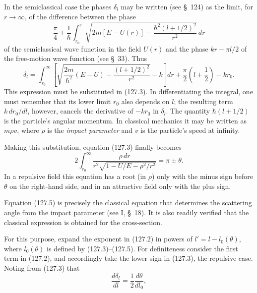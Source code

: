 In the semiclassical case the phases $\delta_l$ may be written (see \S~124)
as the limit, for $r\to\infty$, of the difference between the phase
\[
 \frac\pi4+\frac1\hbar\int_{r_0}^{r}
 \sqrt{2m[E-U(r)]-\frac{\hbar^2(l+1/2)^2}{r^2}}\,dr
\]
of the semiclassical wave function in the field $U(r)$ and the phase
$kr-\pi l/2$ of the free-motion wave function (see \S~33). Thus
\begin{equation}
 \delta_l=\int_{r_0}^{\infty}\left[\sqrt{\frac{2m}{\hbar^2}(E-U)-\frac{(l+1/2)^2}{r^2}}-k\right]dr
 +\frac\pi2\left(l+\frac12\right)-kr_0.
 \tag{127.4}
\end{equation}
This expression must be substituted in (127.3). In differentiating the
integral, one must remember that its lower limit $r_0$ also depends on $l$;
the resulting term $k\,dr_0/dl$, however, cancels the derivative of
$-kr_0$ in $\delta_l$. The quantity $\hbar(l+1/2)$ is the particle's angular
momentum. In classical mechanics it may be written as $m\rho v$, where
$\rho$ is the \emph{impact parameter} and $v$ is the particle's speed at
infinity.

Making this substitution, equation (127.3) finally becomes
\begin{equation}
 2\int_{r_0}^{\infty}\frac{\rho\,dr}{r^2\sqrt{1-U/E-\rho^2/r^2}}=\pi\pm\theta.
 \tag{127.5}
\end{equation}
In a repulsive field this equation has a root (in $\rho$) only with the minus
sign before $\theta$ on the right-hand side, and in an attractive field only
with the plus sign.

Equation (127.5) is precisely the classical equation that determines the
scattering angle from the impact parameter (see I, \S~18). It is also readily
verified that the classical expression is obtained for the cross-section.

For this purpose, expand the exponent in (127.2) in powers of
$l'=l-l_0(\theta)$, where $l_0(\theta)$ is defined by (127.3)--(127.5). For
definiteness consider the first term in (127.2), and accordingly take the
lower sign in (127.3), the repulsive case. Noting from (127.3) that
\[
 \frac{d\delta_l}{dl}=\frac12\frac{d\theta}{dl_0},
\]

